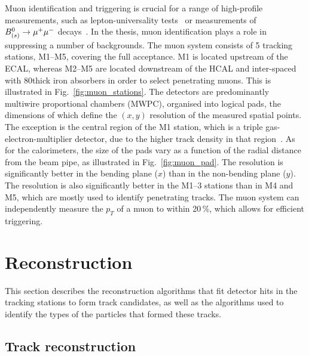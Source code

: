 Muon identification and triggering is crucial for a range of high-profile \lhcb measurements, such as lepton-universality tests~\cite{LHCb-PAPER-2019-009,LHCb-PAPER-2020-002} or measurements of  ${B^0_{(s)}\rightarrow{\ensuremath{\mu^+}} \mu^-}$ decays~\cite{LHCb-PAPER-2017-001}. In the thesis, muon identification plays a role in suppressing a number of backgrounds. The \lhcb muon system consists of 5 tracking stations, M1--M5, covering the full \lhcb acceptance. M1 is located upstream of the ECAL, whereas M2--M5 are located downstream of the HCAL and inter-spaced with 80\cm thick iron absorbers in order to select penetrating muons. This is illustrated in Fig.~\ref{fig:muon_stations}. The detectors are predominantly multiwire proportional chambers (MWPC), organised into logical pads, the dimensions of which define the $(x, y)$ resolution of the measured spatial points. The exception is the central region of the M1 station, which is a triple gas-electron-multiplier detector, due to the higher track density in that region~\cite{LHCb-TDR-5-add-2}. As for the calorimeters, the size of the pads vary as a function of the radial distance from the beam pipe, as illustrated in Fig.~\ref{fig:muon_pad}. The resolution is significantly better in the bending plane ($x$) than in the non-bending plane ($y$). The resolution is also significantly better in the M1--3 stations than in M4 and M5, which are mostly used to identify penetrating tracks. The muon system can independently measure the $p_T$ of a muon to within 20\,\%, which allows for efficient triggering.



\section{Reconstruction} %
\label{sec:reconstruction}

This section describes the reconstruction algorithms that fit detector hits in the tracking stations to form track candidates, as well as the algorithms used to identify the types of the particles that formed these tracks.


\subsection{Track reconstruction} %
\label{sub:track_reconstruction}

